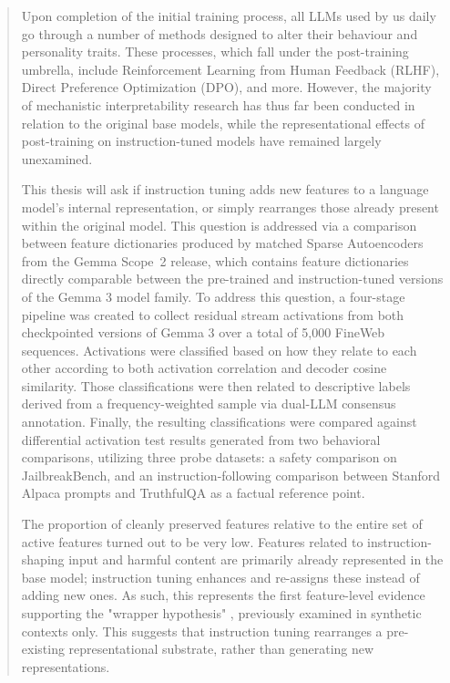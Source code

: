 \begin{abstract}
Upon completion of the initial training process, all LLMs used by us daily go through a number of methods designed to alter their behaviour and personality traits. These processes, which fall under the post-training umbrella, include Reinforcement Learning from Human Feedback (RLHF), Direct Preference Optimization (DPO), and more. However, the majority of mechanistic interpretability research has thus far been conducted in relation to the original base models, while the representational effects of post-training on instruction-tuned models have remained largely unexamined.

This thesis will ask if instruction tuning adds new features to a language model's internal representation, or simply rearranges those already present within the original model. This question is addressed via a comparison between feature dictionaries produced by matched Sparse Autoencoders from the Gemma Scope~2 release, which contains feature dictionaries directly comparable between the pre-trained and instruction-tuned versions of the Gemma 3 model family. To address this question, a four-stage pipeline was created to collect residual stream activations from both checkpointed versions of Gemma 3 over a total of 5,000 FineWeb sequences. Activations were classified based on how they relate to each other according to both activation correlation and decoder cosine similarity. Those classifications were then related to descriptive labels derived from a frequency-weighted sample via dual-LLM consensus annotation. Finally, the resulting classifications were compared against differential activation test results generated from two behavioral comparisons, utilizing three probe datasets: a safety comparison on JailbreakBench, and an instruction-following comparison between Stanford Alpaca prompts and TruthfulQA as a factual reference point.

The proportion of cleanly preserved features relative to the entire set of active features turned out to be very low. Features related to instruction-shaping input and harmful content are primarily already represented in the base model; instruction tuning enhances and re-assigns these instead of adding new ones. As such, this represents the first feature-level evidence supporting the "wrapper hypothesis" , previously examined in synthetic contexts only. This suggests that instruction tuning rearranges a pre-existing representational substrate, rather than generating new representations.

\end{abstract}
